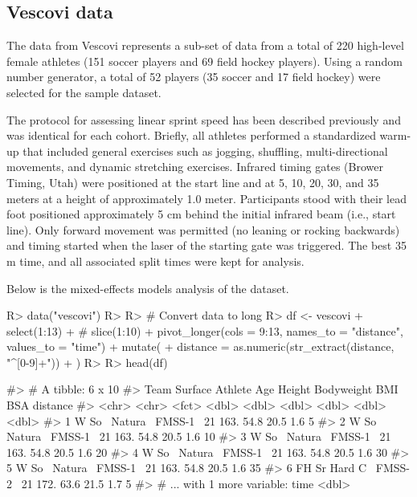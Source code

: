 \documentclass[
]{jss}
\begin{document}
\hypertarget{vescovi-data}{%
\subsection{Vescovi data}\label{vescovi-data}}

The data from Vescovi represents a sub-set of data from a total of 220 high-level female athletes (151 soccer players and 69 field hockey players). Using a random number generator, a total of 52 players (35 soccer and 17 field hockey) were selected for the sample dataset.

The protocol for assessing linear sprint speed has been described previously \citep{vescoviImpactMaximumSpeed2014, vescoviLocomotorHeartRateMetabolic2016, vescoviSprintSpeedCharacteristics2012} and was identical for each cohort. Briefly, all athletes performed a standardized warm-up that included general exercises such as jogging, shuffling, multi-directional movements, and dynamic stretching exercises. Infrared timing gates (Brower Timing, Utah) were positioned at the start line and at 5, 10, 20, 30, and 35 meters at a height of approximately 1.0 meter. Participants stood with their lead foot positioned approximately 5 cm behind the initial infrared beam (i.e., start line). Only forward movement was permitted (no leaning or rocking backwards) and timing started when the laser of the starting gate was triggered. The best 35 m time, and all associated split times were kept for analysis.

Below is the mixed-effects models analysis of the dataset.

\begin{CodeChunk}
\begin{CodeInput}
R> data("vescovi")
R> 
R> # Convert data to long
R> df <- vescovi %
+   select(1:13) %
+   # slice(1:10) %
+   pivot_longer(cols = 9:13, names_to = "distance", values_to = "time") %
+   mutate(
+     distance = as.numeric(str_extract(distance, "^[0-9]+"))
+   )
R> 
R> head(df)
\end{CodeInput}
\begin{CodeOutput}
#> # A tibble: 6 x 10
#>   Team  Surface Athlete   Age Height Bodyweight   BMI   BSA distance
#>   <chr> <chr>   <fct>   <dbl>  <dbl>      <dbl> <dbl> <dbl>    <dbl>
#> 1 W So~ Natura~ FMSS-1~    21   163.       54.8  20.5   1.6        5
#> 2 W So~ Natura~ FMSS-1~    21   163.       54.8  20.5   1.6       10
#> 3 W So~ Natura~ FMSS-1~    21   163.       54.8  20.5   1.6       20
#> 4 W So~ Natura~ FMSS-1~    21   163.       54.8  20.5   1.6       30
#> 5 W So~ Natura~ FMSS-1~    21   163.       54.8  20.5   1.6       35
#> 6 FH Sr Hard C~ FMSS-2~    21   172.       63.6  21.5   1.7        5
#> # ... with 1 more variable: time <dbl>
\end{CodeOutput}
\end{CodeChunk}
\end{document}
